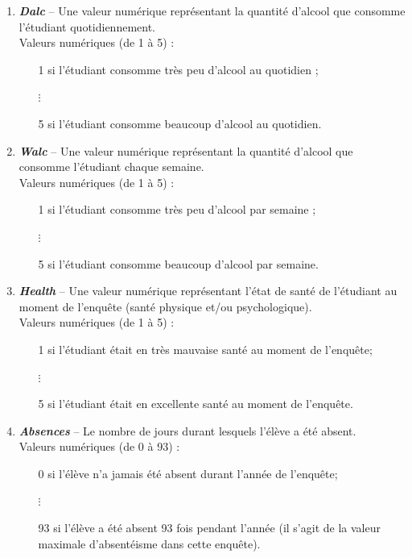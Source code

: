 \documentclass[11pt]{article}
\begin{document}
\begin{enumerate}
\item \textbf{\emph{Dalc}} \--- \label{rap3} Une valeur numérique représentant la quantité d'alcool que consomme l'étudiant quotidiennement. 
	\\\textsf{Valeurs numériques (de 1 à 5) : }\begin{itemize}
	\item[\textbullet] 1 si l'étudiant consomme très peu d'alcool au quotidien ;
	\item[$\vdots$] 
	\item[\textbullet] 5 si l'étudiant consomme beaucoup d'alcool au quotidien.
	\end{itemize}
	
\item \textbf{\emph{Walc}} \--- Une valeur numérique représentant la quantité d'alcool que consomme l'étudiant chaque semaine. 
	\\\textsf{Valeurs numériques (de 1 à 5) : }\begin{itemize}
	\item[\textbullet] 1 si l'étudiant consomme très peu d'alcool par semaine ;
	\item[$\vdots$] 
	\item[\textbullet] 5 si l'étudiant consomme beaucoup d'alcool par semaine.
	\end{itemize}

\item \textbf{\emph{Health}} \--- Une valeur numérique représentant l'état de santé de l'étudiant au moment de l'enquête (santé physique et/ou psychologique). 
	\\\textsf{Valeurs numériques (de 1 à 5) : }\begin{itemize}
	\item[\textbullet] 1 si l'étudiant était en très mauvaise santé au moment de l'enquête;
	\item[$\vdots$] 
	\item[\textbullet] 5 si l'étudiant était en excellente santé au moment de l'enquête.
	\end{itemize}
	
\item \textbf{\emph{Absences}} \--- Le nombre de jours durant lesquels l'élève a été absent. 
	\\\textsf{Valeurs numériques (de 0 à 93) : }\begin{itemize}
	\item[\textbullet] 0 si l'élève n'a jamais été absent durant l'année de l'enquête;
	\item[$\vdots$] 
	\item[\textbullet] 93 si l'élève a été absent 93 fois pendant l'année (il s'agit de la valeur maximale d'absentéisme dans cette enquête).
	\end{itemize}
	

\end{enumerate}
\end{document}

